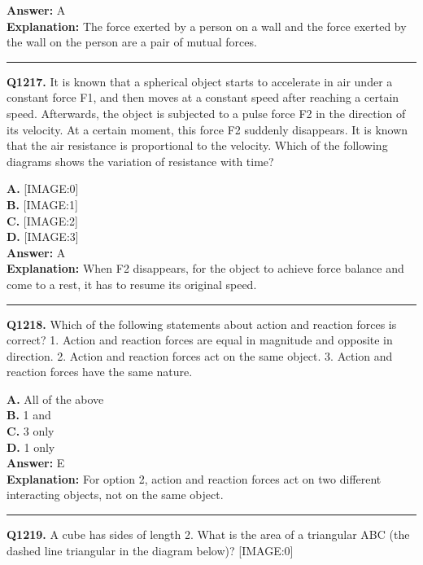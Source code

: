 \documentclass[12pt]{article}
\begin{document}
\textbf{Answer:} A \\
\textbf{Explanation:} The force exerted by a person on a wall and the force exerted by the wall on the person are a pair of mutual forces.

\hrule
\vspace{1em}


\noindent
\textbf{Q1217.} It is known that a spherical object starts to accelerate in air under a constant force F1, and then moves at a constant speed after reaching a certain speed. Afterwards, the object is subjected to a pulse force F2 in the direction of its velocity. At a certain moment, this force F2 suddenly disappears. It is known that the air resistance is proportional to the velocity. Which of the following diagrams shows the variation of resistance with time?



\textbf{A.} [IMAGE:0] \\
\textbf{B.} [IMAGE:1] \\
\textbf{C.} [IMAGE:2] \\
\textbf{D.} [IMAGE:3] \\

\textbf{Answer:} A \\
\textbf{Explanation:} When F2 disappears, for the object to achieve force balance and come to a rest, it has to resume its original speed.

\hrule
\vspace{1em}


\noindent
\textbf{Q1218.} Which of the following statements about action and reaction forces is correct?
1.
Action and reaction forces are equal in magnitude and opposite in direction.
2.
Action and reaction forces act on the same object.
3.
Action and reaction forces have the same nature.



\textbf{A.} All of the above \\
\textbf{B.} 1 and \\
\textbf{C.} 3 only \\
\textbf{D.} 1 only \\

\textbf{Answer:} E \\
\textbf{Explanation:} For option 2, action and reaction forces act on two different interacting objects, not on the same object.

\hrule
\vspace{1em}


\noindent
\textbf{Q1219.} A cube has sides of length 2. What is the area of a triangular ABC (the dashed line triangular in the diagram below)?
[IMAGE:0]
\end{document}
